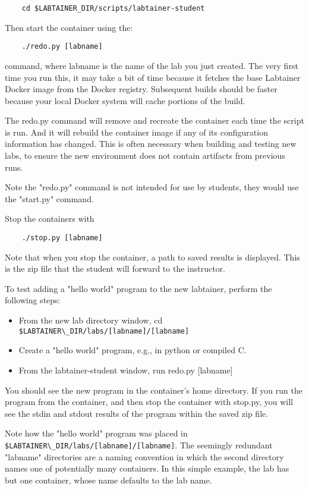\documentclass{article}
\begin{document}
\begin{verbatim}
    cd $LABTAINER_DIR/scripts/labtainer-student
\end{verbatim}
Then start the container using the:

\begin{verbatim}
    ./redo.py [labname] 
\end{verbatim}
command, where labname is the name of the lab you just created.  
The very first time you run this, it may take a bit of time because it fetches the 
base Labtainer Docker image from the Docker registry.  Subsequent builds
should be faster because your local Docker system will cache portions of the build.  

The redo.py command will remove and recreate the container
each time the script is run.  And it will rebuild the container image if any of its configuration 
information has changed.  This is often necessary when building and testing new labs, to ensure the
new environment does not contain artifacts from previous runs.

Note the "redo.py" command is not intended for use by students, they would use the "start.py" command.  

Stop the containers with 
\begin{verbatim}
    ./stop.py [labname]
\end{verbatim}
Note that when you stop the container, a path to saved results is displayed.
This is the zip file that the student will forward to the instructor.

To test adding a "hello world" program to the new labtainer, perform the following steps:
\begin{itemize}
\item From the new lab directory window, cd \verb!$LABTAINER\_DIR/labs/[labname]/[labname]!
\item Create a "hello world" program, e.g., in python or compiled C.
\item From the labtainer-student window, run redo.py [labname]
\end{itemize}
    
You should see the new program in the container's
home directory.  If you run the program from the container, and then stop the container
with stop.py, you will see the stdin and stdout results of the program within the
saved zip file.

Note how the "hello world" program was placed in \verb!$LABTAINER\_DIR/labs/[labname]/[labname]!.
The seemingly redundant "labname" directories are a naming convention in which the
second directory names one of potentially many containers.  In this simple example,
the lab has but one container, whose name defaults to the lab name.
\end{document}
